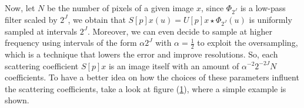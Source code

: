 \documentclass[12pt,a4paper]{article}
\theoremstyle{remark}
\begin{document}
Now, let $N$ be the number of pixels of a given image $x$, since $\Phi_{2^J}$ is a low-pass filter scaled by $2^J$, we obtain that $S[p]x(u) = U[p]x \star \Phi_{2^J}(u)$ is uniformly sampled at intervals $2^J$. Moreover, we can even decide to sample at higher frequency using intervals of the form $\alpha2^J$ with $\alpha = \frac{1}{2}$ to exploit the oversampling, which is a technique that lowers the error and improve resolutions. So, each scattering coefficient
$S[p]x$ is an image itself with an amount of $\alpha^{-2} 2^{-2J} N$ coefficients.
To have a better idea on how the choices of these parameters influent the scattering coefficients, take a look at figure (\ref{JA}), where a simple example is shown.

\begin{figure}[H] \label{JA}
	\centering
	 \\
	\\

\end{figure}
\end{document}
